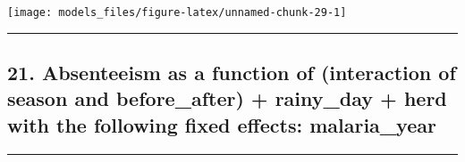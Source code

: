\documentclass[]{article}
\begin{document}
\begin{center}\texttt{[image: models\_files/figure-latex/unnamed-chunk-29-1]} \end{center}

\newpage

\begin{center}\rule{0.5\linewidth}{\linethickness}\end{center}

\subsection{21. Absenteeism as a function of (interaction of season and
before\_after) + rainy\_day + herd with the following fixed effects:
malaria\_year}\label{absenteeism-as-a-function-of-interaction-of-season-and-before_after-rainy_day-herd-with-the-following-fixed-effects-malaria_year}

\begin{center}\rule{0.5\linewidth}{\linethickness}\end{center}
\end{document}
